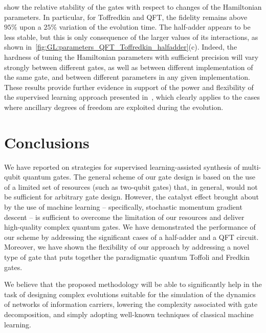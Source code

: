  show the relative stability of the gates with respect to changes of the Hamiltonian parameters.
In particular, for Toffredkin and \ac{QFT}, the fidelity remains above $95\%$ upon a $25\%$ variation of the evolution time.
The half-adder appears to be less stable, but this is only consequence of the larger values of its interactions, as shown in~\cref{fig:GL:parameters_QFT_Toffredkin_halfadder}(c).
Indeed, the hardness of tuning the Hamiltonian parameters with sufficient precision will vary strongly between different gates, as well as between different implementation of the same gate, and between different parameters in any given implementation.
These results provide further evidence in support of the power and flexibility of the supervised learning approach presented in~\cite{innocenti2018supervised,banchi2016quantum}, which clearly applies to the cases where ancillary degrees of freedom are exploited during the evolution.


\section{Conclusions}
\label{sec:GL:conclusions}

We have reported on strategies for supervised learning-assisted synthesis of multi-qubit quantum gates. The general scheme of our gate design is based on the use of a limited set of resources (such as two-qubit gates) that, in general, would not be sufficient for arbitrary gate design. However, the catalyst effect brought about by the use of machine learning -- specifically, stochastic momentum gradient descent -- is sufficient to overcome the limitation of our resources and deliver high-quality complex quantum gates. We have demonstrated the performance of our scheme by addressing the significant cases of a half-adder and a \ac{QFT} circuit. Moreover, we have shown the flexibility of our approach by addressing a novel type of gate that puts together the paradigmatic quantum Toffoli and Fredkin gates.

We believe that the proposed methodology will be able to significantly help in the task of designing complex evolutions suitable for the simulation of the dynamics of networks of information carriers, lowering the complexity associated with gate decomposition, and simply adopting well-known techniques of classical machine learning.

